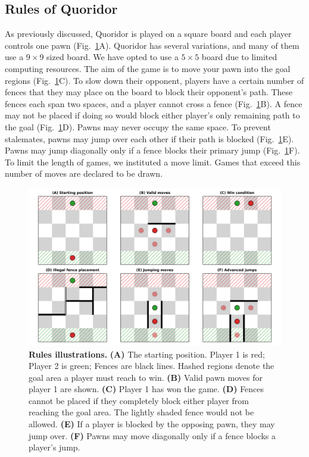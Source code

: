 \documentclass[10pt]{article}
\begin{document}
\subsection{Rules of Quoridor}

As previously discussed, Quoridor is played on a square board and each player controls one pawn (Fig.~\ref{fig:rules}A). Quoridor has several variations, and many of them use a $9 \times 9$ sized board. We have opted to use a $5 \times 5$ board due to limited computing resources. The aim of the game is to move your pawn into the goal regions (Fig.~\ref{fig:rules}C). To slow down their opponent, players have a certain number of fences that they may place on the board to block their opponent's path. These fences each span two spaces, and a player cannot cross a fence (Fig.~\ref{fig:rules}B). A fence may not be placed if doing so would block either player's only remaining path to the goal (Fig.~\ref{fig:rules}D). Pawns may never occupy the same space. To prevent stalemates, pawns may jump over each other if their path is blocked (Fig.~\ref{fig:rules}E). Pawns may jump diagonally only if a fence blocks their primary jump (Fig.~\ref{fig:rules}F). To limit the length of games, we instituted a move limit. Games that exceed this number of moves are declared to be drawn.

\begin{figure}[H]
    \centering
    \includegraphics[width=\linewidth]{rules_demo.png}
    \caption{\textbf{Rules illustrations.} \textbf{(A)} The starting position. Player 1 is red; Player 2 is green; Fences are black lines. Hashed regions denote the goal area a player must reach to win. \textbf{(B)} Valid pawn moves for player 1 are shown. \textbf{(C)} Player 1 has won the game. \textbf{(D)} Fences cannot be placed if they completely block either player from reaching the goal area. The lightly shaded fence would not be allowed. \textbf{(E)} If a player is blocked by the opposing pawn, they may jump over. \textbf{(F)} Pawns may move diagonally only if a fence blocks a player's jump.}
    \label{fig:rules}
\end{figure}
\end{document}
